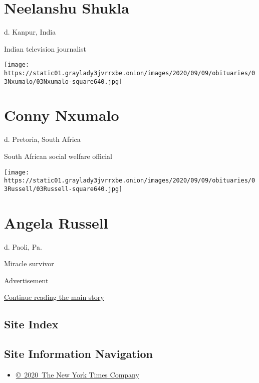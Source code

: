\hypertarget{neelanshu-shukla}{%
\section{Neelanshu Shukla}\label{neelanshu-shukla}}

d. Kanpur, India

Indian television journalist

\texttt{[image: https://static01.graylady3jvrrxbe.onion/images/2020/09/09/obituaries/03Nxumalo/03Nxumalo-square640.jpg]}

\hypertarget{conny-nxumalo}{%
\section{Conny Nxumalo}\label{conny-nxumalo}}

d. Pretoria, South Africa

South African social welfare official

\texttt{[image: https://static01.graylady3jvrrxbe.onion/images/2020/09/09/obituaries/03Russell/03Russell-square640.jpg]}

\hypertarget{angela-russell}{%
\section{Angela Russell}\label{angela-russell}}

d. Paoli, Pa.

Miracle survivor

Advertisement

\protect\hyperlink{after-bottom}{Continue reading the main story}

\hypertarget{site-index}{%
\subsection{Site Index}\label{site-index}}

\hypertarget{site-information-navigation}{%
\subsection{Site Information
Navigation}\label{site-information-navigation}}

\begin{itemize}
\tightlist
\item
  \href{https://help.nytimes3xbfgragh.onion/hc/en-us/articles/115014792127-Copyright-notice}{©~2020~The
  New York Times Company}
\end{itemize}

